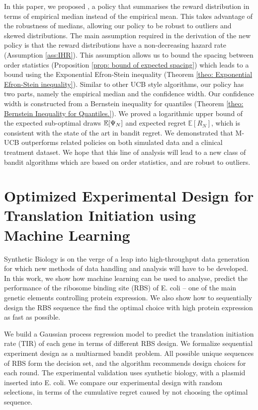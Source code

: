 In this paper, we proposed \ourpolicy, a policy that summarises the reward distribution
in terms of empirical median instead of the empirical mean.
This takes advantage of the robustness of medians,
allowing our policy to be robust to outliers and skewed distributions.
The main assumption required in the derivation of the new policy is that the reward
distributions have a non-decreasing hazard rate (Assumption \ref{ass:IHR}).
This assumption allows us to bound the spacing between order statistics
(Proposition \ref{prop: bound of expected spacing}) which leads to a bound using the
Exponential Efron-Stein inequality (Theorem \ref{theo: Exponential Efron-Stein inequality}).
Similar to other UCB style algorithms, our policy has two parts,
namely the empirical median and the confidence width.
Our confidence width is constructed from a Bernstein inequality for quantiles
(Theorem \ref{theo: Bernstein Inequality for Quantiles.}).
We proved a logarithmic upper bound of the expected sub-optimal draws $\mathbb{E}[\Psi_N]$ and expected regret
$\mathbb{E}[R_N]$, which is consistent with the state of the art in bandit regret.
We demonstrated that M-UCB outperforms related policies on both simulated data and
a clinical treatment dataset.
We hope that this line of analysis will lead to a new class of bandit algorithms
which are based on order statistics, and are robust to outliers.



\section{Optimized Experimental Design for Translation Initiation using Machine Learning}

Synthetic Biology is on the verge of a leap into high-throughput data generation for which new methods of data handling and analysis will have to be developed. In this work, we show how machine learning can be used to analyse, predict the performance of the ribosome binding site (RBS) of E. coli – one of the main genetic elements controlling protein expression. We also show how to sequentially design the RBS sequence the find the optimal choice with high protein expression as fast as possible.  

We build a Gaussian process regression model to predict the translation initiation rate (TIR) of each gene in terms of different RBS design. We formalize sequential experiment design as a multiarmed bandit problem.  All possible unique sequences of RBS form the decision set, and the algorithm recommends design choices for each round. The experimental validation uses synthetic biology, with a plasmid inserted into E. coli. We compare our experimental design with random selections, in terms of the cumulative regret caused by not choosing the optimal sequence.

